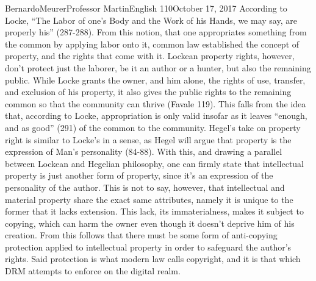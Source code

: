 \documentclass[12pt,letterpaper]{article}
\begin{document}
\begin{mla}{Bernardo}{Meurer}{Professor Martin}{English 110}{October 17, 2017}
        According to Locke, ``The Labor of one's Body and the Work of his Hands, we may say, are properly his'' (287-288). From this notion, that one appropriates something from the common by applying labor onto it, common law established the concept of property, and the rights that come with it. Lockean property rights, however, don't protect just the laborer, be it an author or a hunter, but also the remaining public. While Locke grants the owner, and him alone, the rights of use, transfer, and exclusion of his property, it also gives the public rights to the remaining common so that the community can thrive (Favale 119). This falls from the idea that, according to Locke, appropriation is only valid insofar as it leaves ``enough, and as good'' (291) of the common to the community. Hegel's take on property right is similar to Locke's in a sense, as Hegel will argue that property is the expression of Man's personality (84-88). With this, and drawing a parallel between Lockean and Hegelian philosophy, one can firmly state that intellectual property is just another form of property, since it's an expression of the personality of the author. This is not to say, however, that intellectual and material property share the exact same attributes, namely it is unique to the former that it lacks extension. This lack, its immaterialness, makes it subject to copying, which can harm the owner even though it doesn't deprive him of his creation. From this follows that there must be some form of anti-copying protection applied to intellectual property in order to safeguard the author's rights. Said protection is what modern law calls copyright, and it is that which DRM attempts to enforce on the digital realm.
        

\end{mla}
\end{document}
